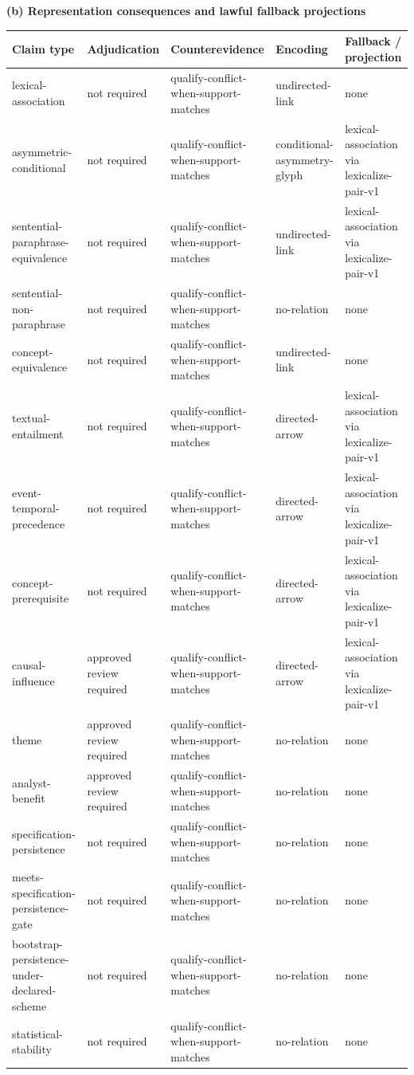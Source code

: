  \textbf{(b) Representation consequences and lawful fallback projections}\par\smallskip
  \begin{tabular}{@{}p{}p{}p{}p{}p{}@{}}
    \toprule
    Claim type & Adjudication & Counterevidence & Encoding & Fallback / projection \\
    \midrule
    lexical-association & not required & qualify-conflict-when-support-matches & undirected-link & none \\
    asymmetric-conditional & not required & qualify-conflict-when-support-matches & conditional-asymmetry-glyph & lexical-association via lexicalize-pair-v1 \\
    sentential-paraphrase-equivalence & not required & qualify-conflict-when-support-matches & undirected-link & lexical-association via lexicalize-pair-v1 \\
    sentential-non-paraphrase & not required & qualify-conflict-when-support-matches & no-relation & none \\
    concept-equivalence & not required & qualify-conflict-when-support-matches & undirected-link & none \\
    textual-entailment & not required & qualify-conflict-when-support-matches & directed-arrow & lexical-association via lexicalize-pair-v1 \\
    event-temporal-precedence & not required & qualify-conflict-when-support-matches & directed-arrow & lexical-association via lexicalize-pair-v1 \\
    concept-prerequisite & not required & qualify-conflict-when-support-matches & directed-arrow & lexical-association via lexicalize-pair-v1 \\
    causal-influence & approved review required & qualify-conflict-when-support-matches & directed-arrow & lexical-association via lexicalize-pair-v1 \\
    theme & approved review required & qualify-conflict-when-support-matches & no-relation & none \\
    analyst-benefit & approved review required & qualify-conflict-when-support-matches & no-relation & none \\
    specification-persistence & not required & qualify-conflict-when-support-matches & no-relation & none \\
    meets-specification-persistence-gate & not required & qualify-conflict-when-support-matches & no-relation & none \\
    bootstrap-persistence-under-declared-scheme & not required & qualify-conflict-when-support-matches & no-relation & none \\
    statistical-stability & not required & qualify-conflict-when-support-matches & no-relation & none \\
    \bottomrule
  \end{tabular}
